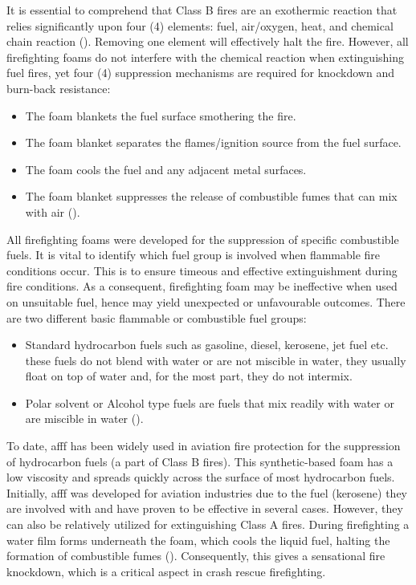 It is essential to comprehend that Class B fires are an exothermic reaction that relies significantly upon four (4) elements: fuel, air/oxygen, heat, and chemical chain reaction (\cite{beneventi2001role}). Removing one element will effectively halt the fire.  However, all firefighting foams do not interfere with the chemical reaction when extinguishing fuel fires, yet four (4) suppression mechanisms are required for knockdown and burn-back resistance: 

\begin{itemize}
    \item The foam blankets the fuel surface smothering the fire. 
    \item The foam blanket separates the flames/ignition source from the fuel surface. 
    \item The foam cools the fuel and any adjacent metal surfaces. 
    \item The foam blanket suppresses the release of combustible fumes that can mix with air (\cite{beneventi2001role}). 
\end{itemize}

All firefighting foams were developed for the suppression of specific combustible fuels. It is vital to identify which fuel group is involved when flammable fire conditions occur. This is to ensure timeous and effective extinguishment during fire conditions. As a consequent, firefighting foam may be ineffective when used on unsuitable fuel, hence may yield unexpected or unfavourable outcomes. There are two different basic flammable or combustible fuel groups:

\begin{itemize}
    \item Standard hydrocarbon fuels such as gasoline, diesel, kerosene, jet fuel etc. these fuels do not blend with water or are not miscible in water, they usually float on top of water and, for the most part, they do not intermix.
    \item Polar solvent or Alcohol type fuels are fuels that mix readily with water or are miscible in water (\cite{beneventi2001role}).
\end{itemize}

To date, \acrshort{afff} has been widely used in aviation fire protection for the suppression of hydrocarbon fuels (a part of Class B fires). This synthetic-based foam has a low viscosity and spreads quickly across the surface of most hydrocarbon fuels. Initially, \acrshort{afff} was developed for aviation industries due to the fuel (kerosene) they are involved with and have proven to be effective in several cases. However, they can also be relatively utilized for extinguishing Class A fires. During firefighting a water film forms underneath the foam, which cools the liquid fuel, halting the formation of combustible fumes (\cite{scheffey1995evaluating}). Consequently, this gives a sensational fire knockdown, which is a critical aspect in crash rescue firefighting.


